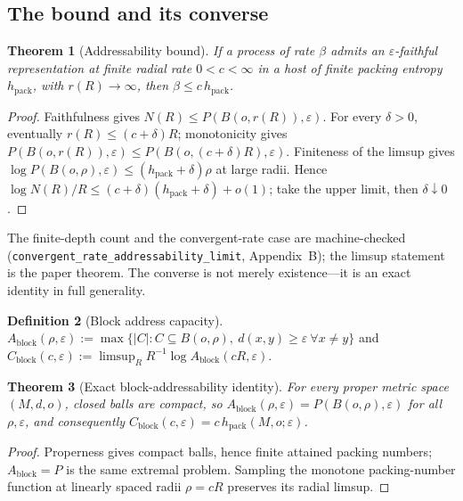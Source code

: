\documentclass[11pt,reqno]{amsart}
\theoremstyle{plain}
\newtheorem{theorem}{Theorem}[section]
\theoremstyle{definition}
\newtheorem{definition}[theorem]{Definition}
\newcommand{\hpack}{h_{\mathrm{pack}}}
\newcommand{\Cblock}{C_{\mathrm{block}}}
\newcommand{\eps}{\varepsilon}
\begin{document}
\subsection{The bound and its converse}

\begin{theorem}[Addressability bound]\label{thm:bound}
If a process of rate $\beta$ admits an $\eps$-faithful representation at finite radial rate $0<c<\infty$ in a host of finite packing entropy $\hpack$, with $r(R)\to\infty$, then $\beta\le c\,\hpack$.
\end{theorem}

\begin{proof}
Faithfulness gives $N(R)\le P(B(o,r(R)),\eps)$. For every $\delta>0$, eventually $r(R)\le(c+\delta)R$; monotonicity gives $P(B(o,r(R)),\eps)\le P(B(o,(c+\delta)R),\eps)$. Finiteness of the limsup gives $\log P(B(o,\rho),\eps)\le(\hpack+\delta)\rho$ at large radii. Hence $\log N(R)/R\le(c+\delta)(\hpack+\delta)+o(1)$; take the upper limit, then $\delta\downarrow0$.
\end{proof}

The finite-depth count and the convergent-rate case are machine-checked (\texttt{convergent\_\allowbreak{}rate\_\allowbreak{}addressability\_\allowbreak{}limit}, Appendix~B); the limsup statement is the paper theorem. The converse is not merely existence---it is an exact identity in full generality.

\begin{definition}[Block address capacity]
$A_{\mathrm{block}}(\rho,\eps):=\max\{|C|:C\subseteq B(o,\rho),\ d(x,y)\ge\eps\ \forall x\ne y\}$ and $\Cblock(c,\eps):=\limsup_R R^{-1}\log A_{\mathrm{block}}(cR,\eps)$.
\end{definition}

\begin{theorem}[Exact block-addressability identity]\label{thm:block}
For every proper metric space $(M,d,o)$, closed balls are compact, so $A_{\mathrm{block}}(\rho,\eps)=P(B(o,\rho),\eps)$ for all $\rho,\eps$, and consequently $\Cblock(c,\eps)=c\,\hpack(M,o;\eps)$.
\end{theorem}

\begin{proof}
Properness gives compact balls, hence finite attained packing numbers; $A_{\mathrm{block}}=P$ is the same extremal problem. Sampling the monotone packing-number function at linearly spaced radii $\rho=cR$ preserves its radial limsup.
\end{proof}
\end{document}
